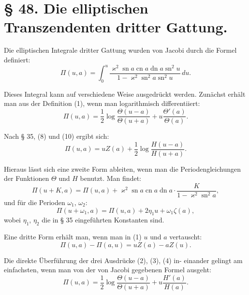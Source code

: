 \documentclass[12pt,a4paper]{article}
\theoremstyle{definition}
\begin{document}
\section*{\S{} 48. Die elliptischen Transzendenten dritter Gattung.}

Die elliptischen Integrale dritter Gattung wurden von
Jacobi durch die Formel definiert:
\begin{equation}\tag{1}
\Pi(u, a) = \int_0^u \frac{\varkappa^2 \operatorname{sn} a \operatorname{cn} a \operatorname{dn} a \operatorname{sn}^2 u}{1 - \varkappa^2 \operatorname{sn}^2 a \operatorname{sn}^2 u} \, du.
\end{equation}

Dieses Integral kann auf verschiedene Weise ausgedr\"{u}ckt
werden. Zun\"{a}chst erh\"{a}lt man aus der Definition (1), wenn
man logarithmisch differentiiert:
\begin{equation}\tag{2}
\Pi(u, a) = \frac{1}{2}\log\frac{\Theta(u - a)}{\Theta(u + a)} + u\frac{\Theta'(a)}{\Theta(a)}.
\end{equation}

Nach \S{} 35, (8) und (10) ergibt sich:
\begin{equation}\tag{3}
\Pi(u, a) = uZ(a) + \frac{1}{2}\log\frac{H(u - a)}{H(u + a)}.
\end{equation}

Hieraus l\"{a}sst sich eine zweite Form ableiten, wenn man die
Periodengleichungen der Funktionen $\Theta$ und $H$ benutzt. Man
findet:
\begin{equation}\tag{4}
\Pi(u + K, a) = \Pi(u, a) + \varkappa^2 \operatorname{sn} a \operatorname{cn} a \operatorname{dn} a \cdot \frac{K}{1 - \varkappa^2 \operatorname{sn}^2 a},
\end{equation}
und f\"{u}r die Perioden $\omega_1$, $\omega_2$:
\begin{equation}\tag{5}
\Pi(u + \omega_1, a) = \Pi(u, a) + 2\eta_1 u + \omega_1 \zeta(a),
\end{equation}
wobei $\eta_1$, $\eta_2$ die in \S{} 35 eingef\"{u}hrten Konstanten sind.

Eine dritte Form erh\"{a}lt man, wenn man in (1) $u$ und $a$
vertauscht:
\begin{equation}\tag{6}
\Pi(u, a) - \Pi(a, u) = uZ(a) - aZ(u).
\end{equation}

Die direkte \"{U}berf\"{u}hrung der drei Ausdr\"{u}cke (2), (3), (4) in-
einander gelingt am einfachsten, wenn man von der von Jacobi
gegebenen Formel ausgeht:
\begin{equation}\tag{7}
\Pi(u, a) = \frac{1}{2}\log\frac{\Theta(u - a)}{\Theta(u + a)} + u\frac{H'(a)}{H(a)}.
\end{equation}
\end{document}

